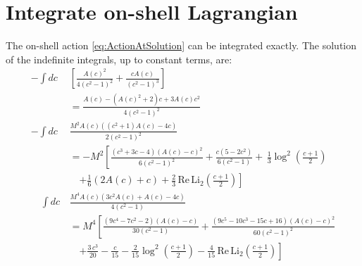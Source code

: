 \section{Integrate on-shell Lagrangian}\label{sec:integrate-action}

The on-shell action \eqref{eq:ActionAtSolution} can be integrated exactly. 
The solution of the indefinite integrals, up to constant terms, are:
\begin{align*}
 - \int dc \, &\left[ \frac{A(c)^2}{4 \left(c^2-1\right)^2}+\frac{c A(c)}{\left(c^2-1\right)^3} \right]\\
    &=\frac{A(c)-\left(A(c)^2+2\right) c+3 A(c) c^2}{4 \left(c^2-1\right)^2}\\
  - \int dc \, &\frac{M^2 A(c) \left(\left(c^2+1\right) A(c)-4 c\right)}{2 \left(c^2-1\right)^2}\\
    &=-M^2 \left[\frac{\left(c^3+3 c-4\right) (A(c)-c)^2}{6 \left(c^2-1\right)^2} 
      +\frac{c \left(5-2 c^2\right)}{6 \left(c^2-1\right)} + \, \frac{1}{3} \log^2\left(\frac{c+1}{2}\right)\right.\\
 & \quad \left. +\frac{1}{6} \left(2 A(c)+ c\right)
   + \frac{2}{3}  \, \text{Re} \, \text{Li}_2\left(\frac{c+1}{2}\right)\right]\\
 \quad \int dc\, & \frac{M^4 A(c) \left(3 c^2 A(c)+A(c)-4 c\right)}{4 \left(c^2-1\right)} \\
 &= M^4 \left[\frac{\left(9 c^4-7 c^2-2\right) (A(c)-c)}{30 \left(c^2-1\right)}+\frac{\left(9 c^5-10 c^3-15 c+16\right) (A(c)-c)^2}{60 \left(c^2-1\right)^2}\right.\\
 & \quad \left. + \frac{3 \, c^3}{20}-\frac{c}{15} -\frac{2}{15} \log ^2\left(\frac{c+1}{2}\right) - \frac{4}{15}\, \text{Re} \, \text{Li}_2\left(\frac{c+1}{2}\right) \right]
\end{align*}

